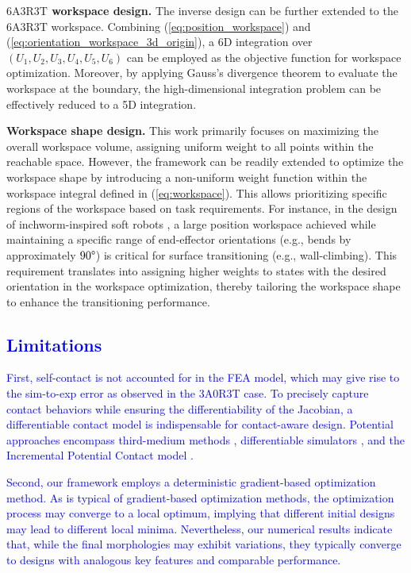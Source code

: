 \documentclass[journal]{IEEEtran}
\theoremstyle{definition}
\begin{document}
\textbf{$6\text{A}3\text{R}3\text{T}$ workspace design.} The inverse design can be further extended to the $6\text{A}3\text{R}3\text{T}$ workspace. Combining  (\ref{eq:position_workspace}) and (\ref{eq:orientation_workspace_3d_origin}), a 6D integration over \(\left(U_1, U_2, U_3, U_4, U_5, U_6\right)\) can be employed as the objective function for workspace optimization. Moreover, by applying Gauss's divergence  theorem to evaluate the workspace at the boundary, the high-dimensional integration problem can be effectively reduced to a 5D integration.

\textbf{Workspace shape design.} This work primarily focuses on maximizing the overall workspace volume, assigning uniform weight to all points within the reachable space. However, the framework can be readily extended to optimize the workspace shape by introducing a non-uniform weight function within the workspace integral defined in (\ref{eq:workspace}). This allows prioritizing specific regions of the workspace based on task requirements. For instance, in the design of inchworm-inspired soft robots \cite{Zhang_Yang_Yan_Zhou_Zou_Gu_2022}, a large position workspace achieved while maintaining a specific range of end-effector orientations (e.g., bends by approximately  $90\degree$) is critical for surface transitioning (e.g., wall-climbing). This requirement translates into assigning higher weights to states with the desired orientation in the workspace optimization, thereby tailoring the workspace shape to enhance the transitioning performance.

\subsection{\textcolor{blue}{Limitations}}
\label{sec:discussion:limitations}
\textcolor{blue}{First, self-contact is not accounted for in the FEA model, which may give rise to the sim-to-exp error as observed in the 3A0R3T case. To precisely capture contact behaviors while ensuring the differentiability of the Jacobian, a differentiable contact model is indispensable for contact-aware design. Potential approaches encompass third-medium methods \cite{Frederiksen_Dalklint_Sigmund_Poulios_2025}, differentiable simulators \cite{Menager_Montaut_Lidec_Carpentier_2025}, and the Incremental Potential Contact model \cite{Huang_Tozoni_Gjoka_Ferguson_Schneider_Panozzo_Zorin_2024}.}

\textcolor{blue}{Second, our framework employs a deterministic gradient-based optimization method. As is typical of gradient-based optimization methods, the optimization process may converge to a local optimum, implying that different initial designs may lead to different local minima. Nevertheless, our numerical results indicate that, while the final morphologies may exhibit variations, they typically converge to designs with analogous key features and comparable performance.}
\end{document}
